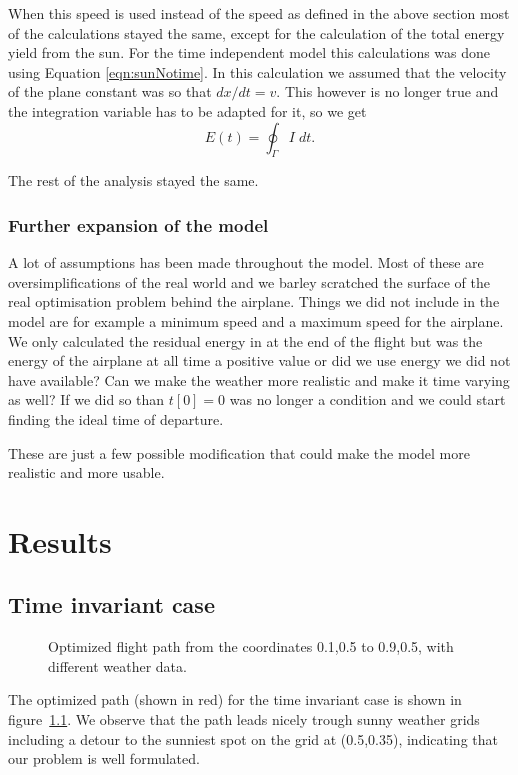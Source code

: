 \documentclass[ twoside,openright,titlepage,numbers=noenddot,headinclude,%
                footinclude=true,cleardoublepage=empty,abstractoff, %
                BCOR=5mm,paper=a4,fontsize=11pt,%
                ngerman,american,%
                ]{scrreprt}
\begin{document}
When this speed is used instead of the speed as defined in the above section most of the calculations stayed the same, except for the calculation of the total energy yield from the sun.
For the time independent model this calculations was done using Equation \ref{eqn:sunNotime}.
In this calculation we assumed that the velocity of the plane  constant was so that $ dx/ dt = v $.
This however is no longer true and the integration variable has to be adapted for it, so we get
\begin{equation} \label{eqn:sunNotime}
E(t) = \oint_{\Gamma} I  \; dt.
\end{equation}

The rest of the analysis stayed the same.


\subsection{Further expansion of the model}

A lot of assumptions has been made throughout the model.
Most of these are oversimplifications of the real world and we barley scratched the surface of the real optimisation problem behind the airplane.
Things we did not include in the model are for example a minimum speed and a maximum speed for the airplane.
We only calculated the residual energy in at the end of the flight but was the energy of the airplane at all time a positive value or did we use energy we did not have available?
Can we make the weather more realistic and make it time varying as well? If we did so than $ t[0] =0 $ was no longer a condition and we could start finding the ideal time of departure.

These are just a few possible modification that could make the model more realistic and more usable.






\chapter{Results}
\section{Time invariant case}
\begin{figure}

\caption{Optimized flight path from the coordinates 0.1,0.5 to 0.9,0.5, with different weather data.}
\label{fig:path1}
\end{figure}
The optimized path (shown in red) for the time invariant case is shown in figure~\ref{fig:path1}. We observe that the path leads nicely trough sunny weather grids including a detour to the sunniest spot on the grid at (0.5,0.35), indicating that our problem is well formulated.
\end{document}
